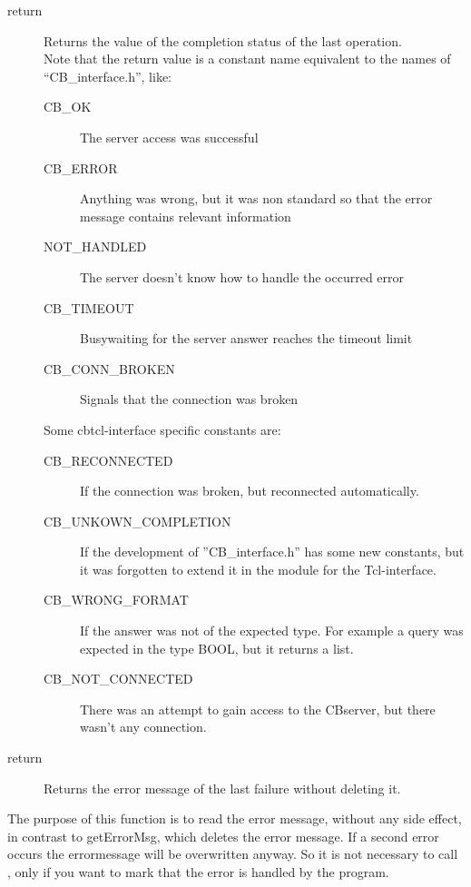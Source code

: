 	\begin{method}{ }
	  \begin{description}
	    \item[ return]
  		Returns the value of the completion status 
		 of the last operation. \\
		Note that the return value is a constant name equivalent 
		 to the names of ``CB\_interface.h'', like:	
		\begin{description}
		 \item[CB\_OK] The server access was successful
		 \item[CB\_ERROR] Anything was wrong, but it was non standard 
			so that the error message contains relevant information
		 \item[NOT\_HANDLED] The server doesn't know how to handle the
			occurred error
		 \item[CB\_TIMEOUT] Busywaiting for the server answer reaches
			the timeout limit
		 \item[CB\_CONN\_BROKEN] Signals that the connection was broken
		\end{description}
		Some cbtcl-interface specific constants are:
		\begin{description}
 		 \item[CB\_RECONNECTED] If the connection was broken, 
			but reconnected automatically. 
		 \item[CB\_UNKOWN\_COMPLETION] If the development 
			of ''CB\_interface.h'' has some new constants, 
			but it was forgotten to extend it
			in the module for the Tcl-interface.
		 \item[CB\_WRONG\_FORMAT] 
			If the answer was not of the expected type.
			For example a query was expected in the type BOOL, 
			 but it returns a list.
		 \item[CB\_NOT\_CONNECTED] 
			There was an attempt to gain access to the CBserver, 
			but there wasn't any connection.
		\end{description}
	  \end{description}
	\end{method}
	\begin{method}{ }
	  \begin{description}
	    \item[ return]
		Returns the error message of the last failure 
		 without deleting it. 
	  \end{description}
	The purpose of this function is to read the error message, 
	 without any side effect, in contrast to getErrorMsg, 
	 which deletes the error message.
	If a second error occurs the errormessage will be overwritten anyway.
	So it is not necessary to call ,
  	 only if you want to mark that the error is handled by the program.
	\end{method}
